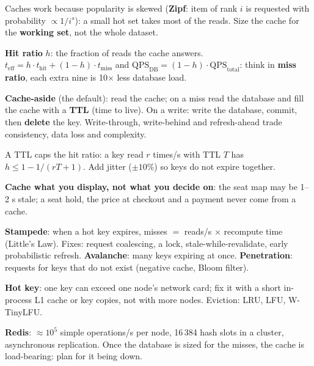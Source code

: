 \stages{\stEstimate\ \stDesign\ \stDeep}

\begin{know}
  \item Caches work because popularity is skewed (\textbf{Zipf}: item of rank $i$ is requested with probability $\propto 1/i^s$): a small hot set takes most of the reads. Size the cache for the \textbf{working set}, not the whole dataset.
  \item \textbf{Hit ratio} $h$: the fraction of reads the cache answers. $t_\text{eff} = h \cdot t_\text{hit} + (1-h) \cdot t_\text{miss}$ and $\text{QPS}_\text{DB} = (1-h) \cdot \text{QPS}_\text{total}$: think in \textbf{miss ratio}, each extra nine is 10$\times$ less database load.
  \item \textbf{Cache-aside} (the default): read the cache; on a miss read the database and fill the cache with a \textbf{TTL} (time to live). On a write: write the database, commit, then \textbf{delete} the key. Write-through, write-behind and refresh-ahead trade consistency, data loss and complexity.
  \item A TTL caps the hit ratio: a key read $r$ times/s with TTL $T$ has $h \le 1 - 1/(rT + 1)$. Add jitter ($\pm 10\%$) so keys do not expire together.
  \item \textbf{Cache what you display, not what you decide on}: the seat map may be 1--2 s stale; a seat hold, the price at checkout and a payment never come from a cache.
  \item \textbf{Stampede}: when a hot key expires, misses $=$ reads/s $\times$ recompute time (Little's Law). Fixes: request coalescing, a lock, stale-while-revalidate, early probabilistic refresh. \textbf{Avalanche}: many keys expiring at once. \textbf{Penetration}: requests for keys that do not exist (negative cache, Bloom filter).
  \item \textbf{Hot key}: one key can exceed one node's network card; fix it with a short in-process L1 cache or key copies, not with more nodes. Eviction: LRU, LFU, W-TinyLFU.
  \item \textbf{Redis}: $\approx 10^5$ simple operations/s per node, 16\,384 hash slots in a cluster, asynchronous replication. Once the database is sized for the misses, the cache is load-bearing: plan for it being down.
\end{know}

